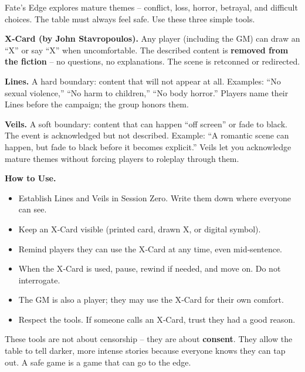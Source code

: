 \begin{tcolorbox}[enhanced, sharp corners, boxrule=1pt, colback=gray!5!white, colframe=gray!75!black, title={Safety Tools: Lines, Veils \& X-Card}]
Fate's Edge explores mature themes – conflict, loss, horror, betrayal, and difficult choices. The table must always feel safe. Use these three simple tools.

\bigskip
\noindent\textbf{X-Card (by John Stavropoulos).} Any player (including the GM) can draw an “X” or say “X” when uncomfortable. The described content is \textbf{removed from the fiction} – no questions, no explanations. The scene is retconned or redirected.

\bigskip
\noindent\textbf{Lines.} A hard boundary: content that will not appear at all. Examples: “No sexual violence,” “No harm to children,” “No body horror.” Players name their Lines before the campaign; the group honors them.

\bigskip
\noindent\textbf{Veils.} A soft boundary: content that can happen “off screen” or fade to black. The event is acknowledged but not described. Example: “A romantic scene can happen, but fade to black before it becomes explicit.” Veils let you acknowledge mature themes without forcing players to roleplay through them.

\bigskip
\noindent\textbf{How to Use.}
\begin{itemize}
  \item Establish Lines and Veils in Session Zero. Write them down where everyone can see.
  \item Keep an X‑Card visible (printed card, drawn X, or digital symbol).
  \item Remind players they can use the X‑Card at any time, even mid‑sentence.
  \item When the X‑Card is used, pause, rewind if needed, and move on. Do not interrogate.
  \item The GM is also a player; they may use the X‑Card for their own comfort.
  \item Respect the tools. If someone calls an X‑Card, trust they had a good reason.
\end{itemize}

These tools are not about censorship – they are about \textbf{consent}. They allow the table to tell darker, more intense stories because everyone knows they can tap out. A safe game is a game that can go to the edge.
\end{tcolorbox}

